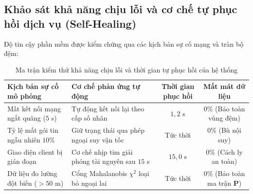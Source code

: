 \begin{table}[H]
\centering
\caption{Đo đạc dung lượng bộ đệm và hiệu quả giảm băng thông mạng của cơ chế Tile Caching}
\label{tab:tile-caching-metrics}
\end{table}

\subsection{Khảo sát khả năng chịu lỗi và cơ chế tự phục hồi dịch vụ (Self-Healing)}

\hspace{0.5cm} Độ tin cậy phần mềm được kiểm chứng qua các kịch bản sự cố mạng và tràn bộ đệm:

\begin{table}[H]
\centering
\caption{Ma trận kiểm thử khả năng chịu lỗi và thời gian tự phục hồi của hệ thống}
\label{tab:fault-tolerance-matrix}
\begin{tabularx}{\linewidth}{>{\RaggedRight}X>{\RaggedRight}Xcc}
\toprule
\textbf{Kịch bản sự cố mô phỏng} & \textbf{Cơ chế phản ứng tự động} & \textbf{Thời gian phục hồi} & \textbf{Mất mát dữ liệu} \\
\midrule
Mất kết nối mạng ngắt quãng ($5$ s) & Tự động kết nối lại theo cấp số nhân & $1{,}2$ s & 0\% (Bảo toàn vùng đệm) \\
Tỷ lệ mất gói tin ngẫu nhiên $10\%$ & Giữ trạng thái qua phép ngoại suy vận tốc & Tức thời & 0\% (Bù nội suy) \\
Giao diện client bị gián đoạn & Cơ chế nhịp tim giải phóng tài nguyên sau $15$ s & $15{,}0$ s & 0\% (Cách ly an toàn) \\
Dữ liệu đo lường đột biến ($> 50$ m) & Cổng Mahalanobis $\chi^2$ loại bỏ ngoại lai & Tức thời & 0\% (Bảo toàn ma trận $\mathbf{P}$) \\
\bottomrule
\end{tabularx}
\end{table}

